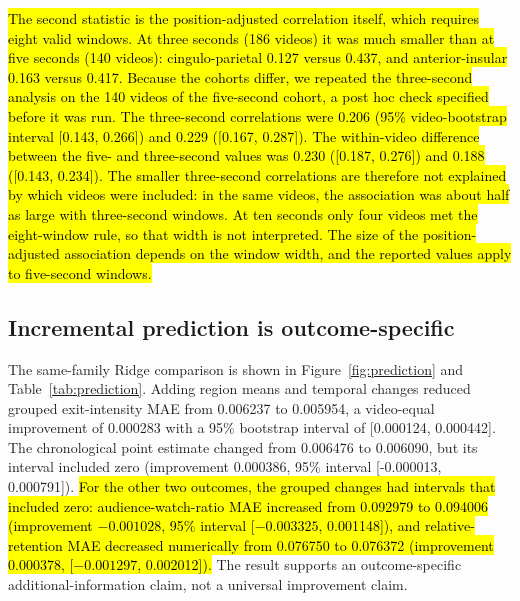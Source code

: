 \documentclass{ieeeaccess}
\newcommand{\rev}[1]{\hl{#1}}
\newcommand{\rev}[1]{#1}
\begin{document}
\rev{The second statistic is the position-adjusted correlation itself, which requires eight valid windows. At three seconds (186 videos) it was much smaller than at five seconds (140 videos): cingulo-parietal 0.127 versus 0.437, and anterior-insular 0.163 versus 0.417. Because the cohorts differ, we repeated the three-second analysis on the 140 videos of the five-second cohort, a post hoc check specified before it was run. The three-second correlations were 0.206 (95\% video-bootstrap interval [0.143, 0.266]) and 0.229 ([0.167, 0.287]). The within-video difference between the five- and three-second values was 0.230 ([0.187, 0.276]) and 0.188 ([0.143, 0.234]). The smaller three-second correlations are therefore not explained by which videos were included: in the same videos, the association was about half as large with three-second windows. At ten seconds only four videos met the eight-window rule, so that width is not interpreted. The size of the position-adjusted association depends on the window width, and the reported values apply to five-second windows.}

\subsection{Incremental prediction is outcome-specific}
The same-family Ridge comparison is shown in Figure~\ref{fig:prediction} and Table~\ref{tab:prediction}. Adding region means and temporal changes reduced grouped exit-intensity MAE from 0.006237 to 0.005954, a video-equal improvement of 0.000283 with a 95\% bootstrap interval of [0.000124, 0.000442]. The chronological point estimate changed from 0.006476 to 0.006090, but its interval included zero (improvement 0.000386, 95\% interval [-0.000013, 0.000791]). \rev{For the other two outcomes, the grouped changes had intervals that included zero: audience-watch-ratio MAE increased from 0.092979 to 0.094006 (improvement $-0.001028$, 95\% interval [$-0.003325$, 0.001148]), and relative-retention MAE decreased numerically from 0.076750 to 0.076372 (improvement 0.000378, [$-0.001297$, 0.002012]).} The result supports an outcome-specific additional-information claim, not a universal improvement claim.
\end{document}
